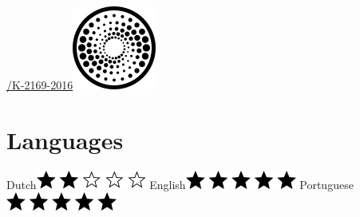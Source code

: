 \documentclass[print]{styles/friggeri-cv-linux} %
\begin{document}
\begin{aside}
\href{http://www.researcherid.com/rid/K-2169-2016}{/K-2169-2016}\includegraphics[scale=0.3]{img/researchid.png}
~
\section{Languages}
Dutch\includegraphics[scale=0.40]{img/2stars.png}
English\includegraphics[scale=0.40]{img/5stars.png}
Portuguese\includegraphics[scale=0.40]{img/5stars.png}
\end{aside}
\end{document}
